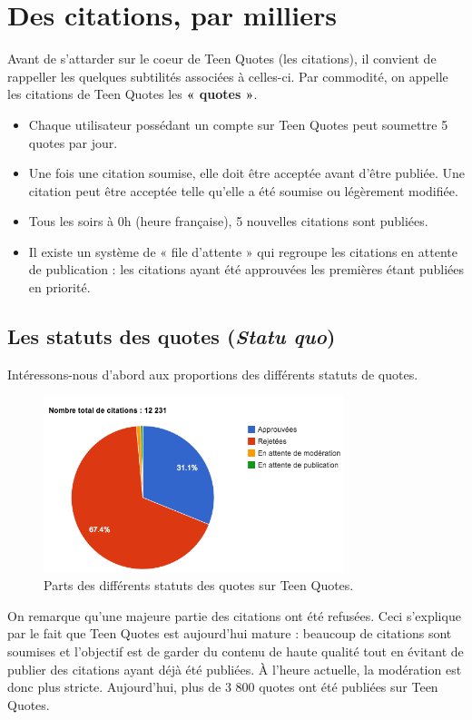 \documentclass{report}
\begin{document}
	\chapter{Des citations, par milliers}
	Avant de s'attarder sur le coeur de Teen Quotes (les citations), il convient de rappeller les quelques subtilités associées à celles-ci. Par commodité, on appelle les citations de Teen Quotes les \textbf{« quotes »}.
	\vspace{10px}
	\begin{itemize}
		\item Chaque utilisateur possédant un compte sur Teen Quotes peut soumettre 5 quotes par jour.
		\item Une fois une citation soumise, elle doit être acceptée avant d'être publiée. Une citation peut être acceptée telle qu'elle a été soumise ou légèrement modifiée.
		\item Tous les soirs à 0h (heure française), 5 nouvelles citations sont publiées.
		\item Il existe un système de « file d'attente » qui regroupe les citations en attente de publication : les citations ayant été approuvées les premières étant publiées en priorité.
	\end{itemize}

	\section{Les statuts des quotes (\textit{Statu quo})}
	Intéressons-nous d'abord aux proportions des différents statuts de quotes.
	\begin{figure}[H]
		\center
		\includegraphics[width=330px]{images/statutsQuotes.png}
		\caption{Parts des différents statuts des quotes sur Teen Quotes.}
	\end{figure}
	On remarque qu'une majeure partie des citations ont été refusées. Ceci s'explique par le fait que Teen Quotes est aujourd'hui mature : beaucoup de citations sont soumises et l'objectif est de garder du contenu de haute qualité tout en évitant de publier des citations ayant déjà été publiées. À l'heure actuelle, la modération est donc plus stricte. Aujourd'hui, plus de 3 800 quotes ont été publiées sur Teen Quotes.
\end{document}
